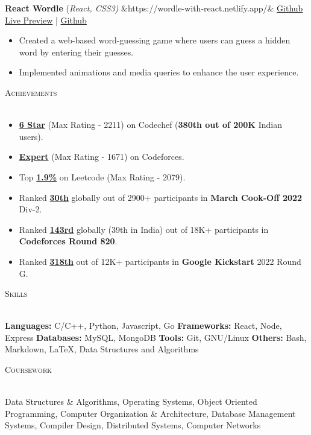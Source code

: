 \documentclass[a4paper]{article}
\newcommand{\sectionSep} { \vspace{3mm} }
\newcommand{\lineunder} {
    \vspace*{-8pt} \\
    \hspace*{-15pt} \hrulefill \\
}
\newcommand{\header} [1] {
    {\hspace*{-18pt}\vspace*{6pt} {
        \fontfamily{qcs}\selectfont \large \scshape #1
    }}
    \vspace*{-6pt} \lineunder
    \vspace{1mm}
}
\newcommand{\projectItem}[5]{
    {\textbf{#1}} {(\sl #2)}\hfill
    \ifx&#3&%
    \href{#4}{Github}\\
    \else
    \href{#3}{Live Preview} | \href{#4}{Github}\\
    \fi
    \begin{itemize}
        #5
    \end{itemize}
}
\begin{document}
\projectItem{React Wordle}{React, CSS3}{https://wordle-with-react.netlify.app/}{https://github.com/AkshatAggarwal14/react-wordle}{
    \item Created a web-based word-guessing game where users can guess a hidden word by entering their guesses.
    \item Implemented animations and media queries to enhance the user experience.
}
\sectionSep


\header{Achievements}
\begin{itemize}
    \item \textbf{\href{https://www.codechef.com/users/master_mind14}{6 Star}} (Max Rating - 2211) on Codechef (\textbf{380th out of 200K} Indian users).
    \item \textbf{\href{https://codeforces.com/profile/master._.mind}{Expert}} (Max Rating - 1671) on Codeforces.
    \item Top \textbf{\href{https://leetcode.com/AkshatAggarwal14/}{1.9\%}} on Leetcode (Max Rating - 2079).
    \item Ranked \textbf{\href{https://www.codechef.com/rankings/COOK139B?itemsPerPage=100&order=asc&page=1&search=master_mind14&sortBy=rank}{30th}} globally out of 2900+ participants in \textbf{March Cook-Off 2022} Div-2.
    \item Ranked \textbf{\href{https://codeforces.com/contest/1729/standings/participant/140098304\#p140098304}{143rd}} globally (39th in India) out of 18K+ participants in \textbf{Codeforces Round 820}.
    \item Ranked \textbf{\href{https://clist.by/standings/kick-start-round-g-31261744/?find_me=45689030}{318th}} out of 12K+ participants in \textbf{Google Kickstart} 2022 Round G.
\end{itemize}
\sectionSep


\header{Skills}
\textbf{Languages:} C/C++, Python, Javascript, Go
\quad \textbf{Frameworks:} React, Node, Express
\quad \textbf{Databases:} MySQL, MongoDB
\quad \textbf{Tools:} Git, GNU/Linux
\quad \textbf{Others:} Bash, Markdown, \LaTeX, Data Structures and Algorithms
\sectionSep

\header{Coursework}
Data Structures \& Algorithms,
Operating Systems,
Object Oriented Programming,
Computer Organization \& Architecture,
Database Management Systems,
Compiler Design,
Distributed Systems,
Computer Networks
\end{document}
